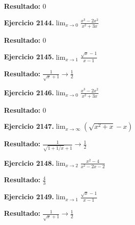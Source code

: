 \documentclass[10pt,a4paper]{article}
\begin{document}
\begin{solbox}
\textbf{Resultado:} \(\displaystyle 0\)
\end{solbox}

\newpage
\begin{ejbox}
\textbf{Ejercicio 2144.}\quad $\lim_{x\to 0} \frac{x^3-2x^2}{x^2+3x}$
\end{ejbox}

\begin{solbox}
\textbf{Resultado:} \(\displaystyle 0\)
\end{solbox}

\begin{ejbox}
\textbf{Ejercicio 2145.}\quad $\lim_{x\to 1} \frac{\sqrt{x}-1}{x-1}$
\end{ejbox}

\begin{solbox}
\textbf{Resultado:} \(\displaystyle \frac{1}{\sqrt{x}+1} \to \frac{1}{2}\)
\end{solbox}

\begin{ejbox}
\textbf{Ejercicio 2146.}\quad $\lim_{x\to 0} \frac{x^3-2x^2}{x^2+3x}$
\end{ejbox}

\begin{solbox}
\textbf{Resultado:} \(\displaystyle 0\)
\end{solbox}

\newpage
\begin{ejbox}
\textbf{Ejercicio 2147.}\quad $\lim_{x\to \infty} (\sqrt{x^2+x} - x)$
\end{ejbox}

\begin{solbox}
\textbf{Resultado:} \(\displaystyle \frac{1}{\sqrt{1+1/x}+1} \to \frac{1}{2}\)
\end{solbox}

\begin{ejbox}
\textbf{Ejercicio 2148.}\quad $\lim_{x\to 2} \frac{x^2-4}{x^2-2x-2}$
\end{ejbox}

\begin{solbox}
\textbf{Resultado:} \(\displaystyle \frac{4}{3}\)
\end{solbox}

\begin{ejbox}
\textbf{Ejercicio 2149.}\quad $\lim_{x\to 1} \frac{\sqrt{x}-1}{x-1}$
\end{ejbox}

\begin{solbox}
\textbf{Resultado:} \(\displaystyle \frac{1}{\sqrt{x}+1} \to \frac{1}{2}\)
\end{solbox}
\end{document}
